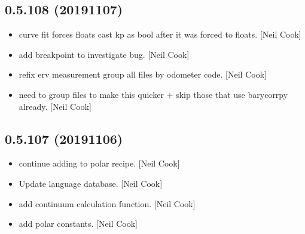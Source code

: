 \documentclass[a4paper,10pt,english]{report}
\begin{document}
\subsection{0.5.108 (2019\sphinxhyphen{}11\sphinxhyphen{}07)}
\label{\detokenize{misc/changelog:id53}}\begin{itemize}
\item {} 
 \sphinxhyphen{} curve fit forces floats \sphinxhyphen{} cast kp as
bool after it was forced to floats. {[}Neil Cook{]}

\item {} 
 \sphinxhyphen{} add breakpoint to investigate bug. {[}Neil
Cook{]}

\item {} 
 \sphinxhyphen{} re\sphinxhyphen{}fix erv measurement \sphinxhyphen{} group all
files by odometer code. {[}Neil Cook{]}

\item {} 
 \sphinxhyphen{} need to group files to make this
quicker + skip those that use barycorrpy already. {[}Neil Cook{]}

\end{itemize}


\subsection{0.5.107 (2019\sphinxhyphen{}11\sphinxhyphen{}06)}
\label{\detokenize{misc/changelog:id54}}\begin{itemize}
\item {} 
 \sphinxhyphen{} continue adding to polar recipe.
{[}Neil Cook{]}

\item {} 
Update language database. {[}Neil Cook{]}

\item {} 
 \sphinxhyphen{} add continuum calculation function. {[}Neil Cook{]}

\item {} 
 \sphinxhyphen{} add polar constants. {[}Neil
Cook{]}

\end{itemize}
\end{document}
